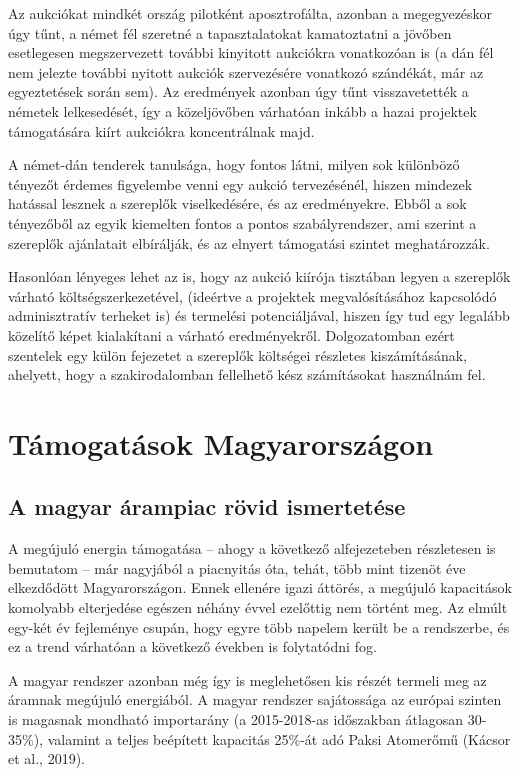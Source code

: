 \documentclass[twoside, magyar, showtrims]{corvinusphd}
\begin{document}
Az aukciókat mindkét ország pilotként aposztrofálta, azonban a megegyezéskor
úgy tűnt, a német fél szeretné a tapasztalatokat kamatoztatni a jövőben
esetlegesen megszervezett további kinyitott aukciókra vonatkozóan is
(a dán fél nem jelezte további nyitott aukciók szervezésére vonatkozó szándékát,
már az egyeztetések során sem). Az eredmények azonban úgy tűnt visszavetették
a németek lelkesedését, így a közeljövőben várhatóan inkább a hazai projektek
támogatására kiírt aukciókra koncentrálnak majd.

A német-dán tenderek tanulsága, hogy fontos látni,
milyen sok különböző tényezőt érdemes figyelembe
venni egy aukció tervezésénél, hiszen mindezek hatással lesznek a szereplők
viselkedésére, és az eredményekre. Ebből a sok tényezőből az egyik kiemelten fontos
a pontos szabályrendszer, ami szerint a szereplők ajánlatait elbírálják, és 
az elnyert támogatási szintet meghatározzák.

Hasonlóan lényeges lehet az is, hogy az aukció kiírója
tisztában legyen a szereplők várható költségszerkezetével,
(ideértve a projektek megvalósításához kapcsolódó adminisztratív terheket is)
és termelési potenciáljával, hiszen így tud egy legalább közelítő képet kialakítani
a várható eredményekről. Dolgozatomban ezért szentelek egy külön
fejezetet a szereplők költségei részletes kiszámításának, ahelyett, hogy
a szakirodalomban fellelhető kész számításokat használnám fel.

\section{Támogatások Magyarországon}

\subsection{A magyar árampiac rövid ismertetése}

A megújuló energia támogatása -- ahogy a következő
alfejezeteben részletesen is bemutatom -- már nagyjából a piacnyitás óta,
tehát, több mint tizenöt éve elkezdődött Magyarországon.
Ennek ellenére igazi áttörés, a megújuló kapacitások
komolyabb elterjedése egészen néhány évvel ezelőttig 
nem történt meg. Az elmúlt egy-két év fejleménye
csupán, hogy egyre több napelem került be a rendszerbe,
és ez a trend várhatóan a következő években is folytatódni fog.

A magyar rendszer azonban még így is meglehetősen
kis részét termeli meg az áramnak megújuló energiából.
A magyar rendszer sajátossága az európai szinten is
magasnak mondható importarány (a 2015-2018-as
időszakban átlagosan 30-35\%), 
valamint a teljes beépített kapacitás 25\%-át adó
Paksi Atomerőmű (Kácsor et al., 2019).
\end{document}
